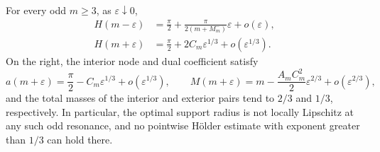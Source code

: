 \begin{theorem}\label{thm:cusp}
For every odd $m\ge3$, as $\varepsilon\downarrow0$,
\begin{align}
 H(m-\varepsilon)
   &=\frac\pi2+\frac{\pi}{2(m+M_m^-)}\varepsilon
                       +o(\varepsilon),\label{eq:left-cusp}\\
 H(m+\varepsilon)
   &=\frac\pi2+2C_m\varepsilon^{1/3}
                       +o(\varepsilon^{1/3}).\label{eq:right-cusp}
\end{align}
On the right, the interior node and dual coefficient satisfy
\[
 a(m+\varepsilon)=\frac\pi2-C_m\varepsilon^{1/3}
                                  +o(\varepsilon^{1/3}),\qquad
 M(m+\varepsilon)=m-\frac{A_mC_m^2}{2}\varepsilon^{2/3}
                                  +o(\varepsilon^{2/3}),
\]
and the total masses of the interior and exterior pairs tend to $2/3$
and $1/3$, respectively. In particular, the optimal support radius is
not locally Lipschitz at any such odd resonance, and no pointwise
H\"older estimate with exponent greater than $1/3$ can hold there.
\end{theorem}


